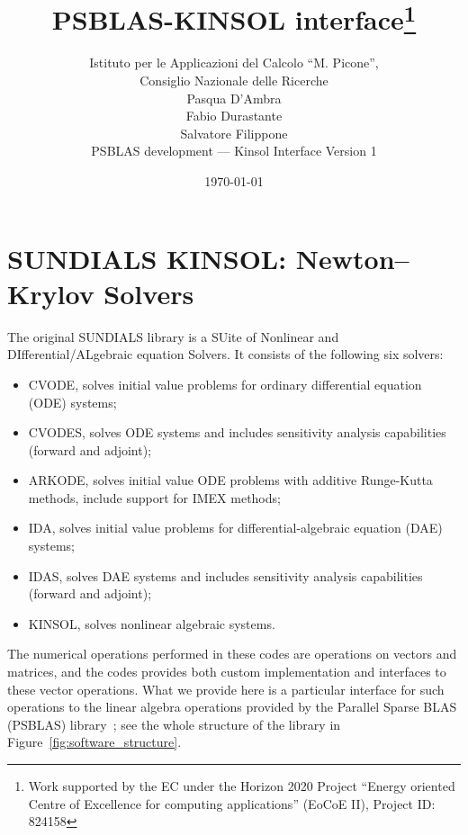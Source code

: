 \documentclass[twoside,a4paper]{refart}
\title{PSBLAS-KINSOL interface\thanks{Work supported by the EC under the Horizon 2020 Project ``Energy oriented Centre of Excellence for computing applications'' (EoCoE II), Project ID: 824158}}
\author{Istituto per le Applicazioni del Calcolo ``M. Picone'',\\
	Consiglio Nazionale delle Ricerche \\
	Pasqua D'Ambra \\
	Fabio Durastante \\
	Salvatore Filippone \\
	PSBLAS development --- Kinsol Interface Version 1}
\date{\today}
\theoremstyle{definition}
\begin{document}
	\maketitle
	
	\tableofcontents
	\newpage
	
	
	\section{SUNDIALS KINSOL: Newton--Krylov Solvers}
	
	The original SUNDIALS library is a SUite of Nonlinear and DIfferential/ALgebraic equation Solvers.  It consists of the following six solvers:
	\begin{itemize}
		\item CVODE, solves initial value problems for ordinary differential equation (ODE) systems;
		\item CVODES, solves ODE systems and includes sensitivity analysis capabilities (forward and adjoint);
		\item ARKODE, solves initial value ODE problems with additive Runge-Kutta methods, include support for IMEX methods;
		\item IDA, solves initial value problems for differential-algebraic equation (DAE) systems;
		\item IDAS, solves DAE systems and includes sensitivity analysis capabilities (forward and adjoint);
		\item KINSOL, solves nonlinear algebraic systems.
	\end{itemize}
	
	The numerical operations performed in these codes are operations on vectors and matrices, and the codes provides both custom implementation and interfaces to these vector operations. What we provide here is a particular interface for such operations to the linear algebra operations provided by the Parallel Sparse BLAS (PSBLAS) library~\cite{filippone2000psblas,Filippone:2017:SMM:3034774.3017994,cardellini2014design,filippone2012object}; see the whole structure of the library in Figure~\ref{fig:software_structure}.
\end{document}
